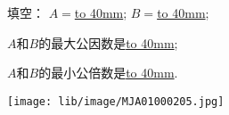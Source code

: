 填空：
$A=$\underline{\hbox to 40mm{}};
$B=$\underline{\hbox to 40mm{}};

$A$和$B$的最大公因数是\underline{\hbox to 40mm{}};

$A$和$B$的最小公倍数是\underline{\hbox to 40mm{}}.

\texttt{[image: lib/image/MJA01000205.jpg]}